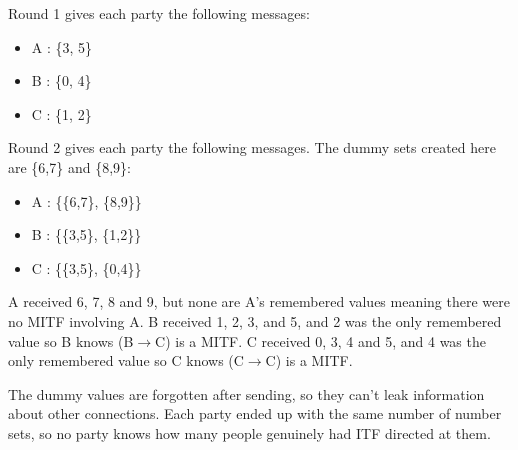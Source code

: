 \documentclass[conference]{IEEEtran}
\begin{document}
Round 1 gives each party the following messages:
\begin{itemize}
\item A : \{3, 5\}
\item B : \{0, 4\}
\item C : \{1, 2\}
\end{itemize}

Round 2 gives each party the following messages. The dummy sets created here are \{6,7\} and \{8,9\}:
\begin{itemize}
\item A : \{\{6,7\}, \{8,9\}\}
\item B : \{\{3,5\}, \{1,2\}\}
\item C : \{\{3,5\}, \{0,4\}\}
\end{itemize}

A received 6, 7, 8 and 9, but none are A's remembered values meaning there were no MITF involving A. B received 1, 2, 3, and 5, and 2 was the only remembered value so B knows (B$\rightarrow$C) is a MITF. C received 0, 3, 4 and 5, and 4 was the only remembered value so C knows (C$\rightarrow$C) is a MITF.

The dummy values are forgotten after sending, so they can't leak information about other connections. Each party ended up with the same number of number sets, so no party knows how many people genuinely had ITF directed at them.
\end{document}
